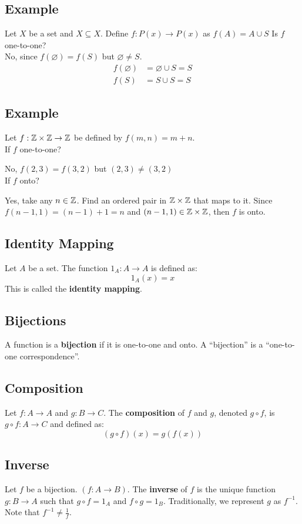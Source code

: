 \documentclass[letterpaper, 12pt]{math}
\begin{document}
\subsection*{Example}
Let \( X \) be a set and \( X \subseteq X \). Define \( f:P(x)\to P(x) \) as
\( f(A) = A \cup S \) Is \( f \) one-to-one? \\
No, since \( f(\varnothing) = f(S) \) but \( \varnothing \neq S \).
\begin{align*}
  f(\varnothing) &= \varnothing \cup S = S \\
  f(S) &= S \cup S = S
\end{align*}

\subsection*{Example}
Let \( f:\mathbb{Z}\times\mathbb{Z}\to\mathbb{Z} \) be defined by \( f(m,n) = m+n \). \\
If \( f \) one-to-one? \par
No, \( f(2,3) = f(3,2) \) but \( (2,3) \neq (3,2) \) \\
If \( f \) onto? \par
Yes, take any \( n\in\mathbb{Z} \). Find an ordered pair in \( \mathbb{Z}\times\mathbb{Z} \) that
maps to it. Since \( f(n-1,1) = (n-1)+1 = n \) and \( (n-1,1)\in\mathbb{Z}\times\mathbb{Z} \),
then \( f \) is onto.

\subsection*{Identity Mapping}
Let \( A \) be a set. The function \( 1_{A}:A\to A \) is defined as:
\[ 1_{A}(x) = x \]
This is called the \textbf{identity mapping}.

\subsection*{Bijections}
A function is a \textbf{bijection} if it is one-to-one and onto. A
``bijection'' is a ``one-to-one correspondence''.

\subsection*{Composition}
Let \( f:A\to A \) and \( g:B\to C \). The \textbf{composition} of \( f \)
and \( g \), denoted \( g\circ f \), is \( g\circ f:A\to C \) and defined as:
\[ (g\circ f)(x) = g(f(x)) \]

\subsection*{Inverse}
Let \( f \) be a bijection. \( (f:A\to B) \). The \textbf{inverse} of \( f \)
is the unique function \( g:B\to A \) such that \( g\circ f = 1_{A} \) and
\( f\circ g = 1_{B} \). Traditionally, we represent \( g \) as \( f^{-1} \).
Note that \( f^{-1} \neq \frac{1}{f} \).
\end{document}
